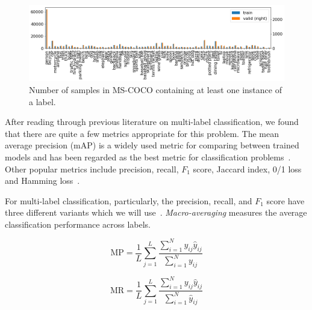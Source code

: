 \documentclass[12pt,journal,compsoc]{IEEEtran}
\begin{document}
\begin{figure}[!t]
\normalsize
\includegraphics[width=\linewidth]{mscoco_label_counts.png}
\caption{Number of samples in MS-COCO containing at least one instance of a label.}
\label{fig:coco_label_counts}
\vspace*{4pt}
\end{figure}



After reading through previous literature on multi-label classification, we found that there are quite a few metrics appropriate for this problem. The mean average precision (mAP) is a widely used metric for comparing between trained models and has been regarded as the best metric for classification problems~\cite{Lavrenko_2014}.  Other popular metrics include precision, recall, $F_1$ score, Jaccard index, 0/1 loss and Hamming loss~\cite{Tsoumakas:2007,SOKOLOVA2009427,Herrera:2016}. 

For multi-label classification, particularly, the precision, recall, and $F_1$ score have three different variants which we will use~\cite{MADJAROV20123084,WuZ16,Koyejo:2015,GongJLTI13}. \textit{Macro-averaging} measures the average classification performance across labels.  

\begin{equation}
\mathrm{MP} = \frac{1}{L}\sum_{j=1}^{L}\frac{\sum_{i=1}^{N}y_{ij}\hat{y}_{ij}}{\sum_{i=1}^{N}y_{ij}}
\label{eq:MP}
\end{equation}

\begin{equation}
\mathrm{MR} = \frac{1}{L}\sum_{j=1}^{L}\frac{\sum_{i=1}^{N}y_{ij}\hat{y}_{ij}}{\sum_{i=1}^{N}\hat{y}_{ij}}
\label{eq:MR}
\end{equation}
\end{document}
